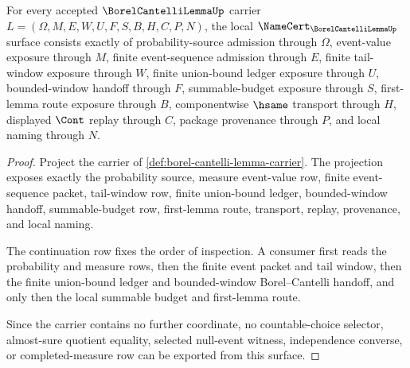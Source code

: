 \begin{theorem}
\label{thm:borel-cantelli-lemma-namecert-surface}
For every accepted $\BorelCantelliLemmaUp$ carrier $L=(\Omega,M,E,W,U,F,S,B,H,C,P,N)$, the local $\NameCert_{\BorelCantelliLemmaUp}$ surface consists exactly of probability-source admission through $\Omega$, event-value exposure through $M$, finite event-sequence admission through $E$, finite tail-window exposure through $W$, finite union-bound ledger exposure through $U$, bounded-window handoff through $F$, summable-budget exposure through $S$, first-lemma route exposure through $B$, componentwise $\hsame$ transport through $H$, displayed $\Cont$ replay through $C$, package provenance through $P$, and local naming through $N$.
\end{theorem}
\begin{proof}
Project the carrier of \autoref{def:borel-cantelli-lemma-carrier}. The projection exposes exactly the probability source, measure event-value row, finite event-sequence packet, tail-window row, finite union-bound ledger, bounded-window handoff, summable-budget row, first-lemma route, transport, replay, provenance, and local naming.

The continuation row fixes the order of inspection. A consumer first reads the probability and measure rows, then the finite event packet and tail window, then the finite union-bound ledger and bounded-window Borel--Cantelli handoff, and only then the local summable budget and first-lemma route.

Since the carrier contains no further coordinate, no countable-choice selector, almost-sure quotient equality, selected null-event witness, independence converse, or completed-measure row can be exported from this surface.
\end{proof}


